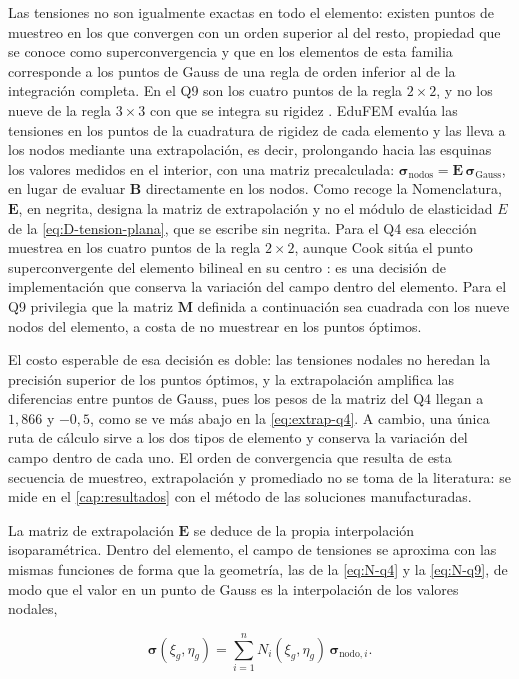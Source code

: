 Las tensiones no son igualmente exactas en todo el elemento: existen puntos de muestreo en los que convergen con un orden superior al del resto, propiedad que se conoce como superconvergencia y que en los elementos de esta familia corresponde a los puntos de Gauss de una regla de orden inferior al de la integración completa. En el Q9 son los cuatro puntos de la regla $2\times2$, y no los nueve de la regla $3\times3$ con que se integra su rigidez \autocite[pp.~230-231]{cook2002concepts}. EduFEM evalúa las tensiones en los puntos de la cuadratura de rigidez de cada elemento y las lleva a los nodos mediante una extrapolación, es decir, prolongando hacia las esquinas los valores medidos en el interior, con una matriz precalculada: $\bm{\sigma}_{\text{nodos}} = \bm{E}\,\bm{\sigma}_{\text{Gauss}}$, en lugar de evaluar $\bm{B}$ directamente en los nodos. Como recoge la Nomenclatura, $\bm{E}$, en negrita, designa la matriz de extrapolación y no el módulo de elasticidad $E$ de la \autoref{eq:D-tension-plana}, que se escribe sin negrita. Para el Q4 esa elección muestrea en los cuatro puntos de la regla $2\times2$, aunque Cook sitúa el punto superconvergente del elemento bilineal en su centro \autocite[p.~230]{cook2002concepts}: es una decisión de implementación que conserva la variación del campo dentro del elemento. Para el Q9 privilegia que la matriz $\bm{M}$ definida a continuación sea cuadrada con los nueve nodos del elemento, a costa de no muestrear en los puntos óptimos.

El costo esperable de esa decisión es doble: las tensiones nodales no heredan la precisión superior de los puntos óptimos, y la extrapolación amplifica las diferencias entre puntos de Gauss, pues los pesos de la matriz del Q4 llegan a $1{,}866$ y $-0{,}5$, como se ve más abajo en la \autoref{eq:extrap-q4}. A cambio, una única ruta de cálculo sirve a los dos tipos de elemento y conserva la variación del campo dentro de cada uno. El orden de convergencia que resulta de esta secuencia de muestreo, extrapolación y promediado no se toma de la literatura: se mide en el \autoref{cap:resultados} con el método de las soluciones manufacturadas.

La matriz de extrapolación $\bm{E}$ se deduce de la propia interpolación isoparamétrica. Dentro del elemento, el campo de tensiones se aproxima con las mismas funciones de forma que la geometría, las de la \autoref{eq:N-q4} y la \autoref{eq:N-q9}, de modo que el valor en un punto de Gauss es la interpolación de los valores nodales,

\begin{equation}
\bm{\sigma}(\xi_g,\eta_g) = \sum_{i=1}^{n} N_i(\xi_g,\eta_g)\,\bm{\sigma}_{\text{nodo},i}.
\label{eq:interp-tension}
\end{equation}

